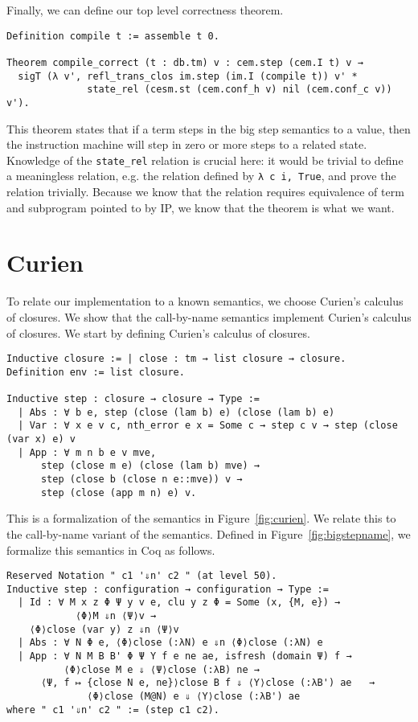Finally, we can define our top level correctness theorem.

\begin{verbatim}
Definition compile t := assemble t 0.

Theorem compile_correct (t : db.tm) v : cem.step (cem.I t) v → 
  sigT (λ v', refl_trans_clos im.step (im.I (compile t)) v' *
              state_rel (cesm.st (cem.conf_h v) nil (cem.conf_c v)) v').
\end{verbatim}
This theorem states that if a term steps in the big step semantics to a value,
then the instruction machine will step in zero or more steps to a related state.
Knowledge of the \texttt{state\_rel} relation is crucial here: it would be
trivial to define a meaningless relation, e.g. the relation defined by
\texttt{λ c i, True}, and prove the relation trivially. Because we know that
the relation requires equivalence of term and subprogram pointed to by IP, we
know that the theorem is what we want.

\section{Curien}

To relate our implementation to a known semantics, we choose Curien's calculus
of closures. We show that the call-by-name \ce semantics implement Curien's
calculus of closures. We start by defining Curien's calculus of closures. 

\begin{verbatim}
Inductive closure := | close : tm → list closure → closure. 
Definition env := list closure.

Inductive step : closure → closure → Type := 
  | Abs : ∀ b e, step (close (lam b) e) (close (lam b) e)
  | Var : ∀ x e v c, nth_error e x = Some c → step c v → step (close (var x) e) v
  | App : ∀ m n b e v mve, 
      step (close m e) (close (lam b) mve) → 
      step (close b (close n e::mve)) v → 
      step (close (app m n) e) v.
\end{verbatim}

This is a formalization of the semantics in Figure~\ref{fig:curien}. We relate
this to the call-by-name variant of the \ce semantics. Defined in
Figure~\ref{fig:bigstepname}, we formalize this semantics in Coq as follows.

\begin{verbatim}
Reserved Notation " c1 '⇓n' c2 " (at level 50).
Inductive step : configuration → configuration → Type :=
  | Id : ∀ M x z Φ Ψ y v e, clu y z Φ = Some (x, {M, e}) → 
            ⟨Φ⟩M ⇓n ⟨Ψ⟩v →
    ⟨Φ⟩close (var y) z ⇓n ⟨Ψ⟩v
  | Abs : ∀ N Φ e, ⟨Φ⟩close (:λN) e ⇓n ⟨Φ⟩close (:λN) e
  | App : ∀ N M B B' Φ Ψ Υ f e ne ae, isfresh (domain Ψ) f → 
          ⟨Φ⟩close M e ⇓ ⟨Ψ⟩close (:λB) ne → 
      ⟨Ψ, f ↦ {close N e, ne}⟩close B f ⇓ ⟨Υ⟩close (:λB') ae   →
              ⟨Φ⟩close (M@N) e ⇓ ⟨Υ⟩close (:λB') ae
where " c1 '⇓n' c2 " := (step c1 c2).
\end{verbatim}

